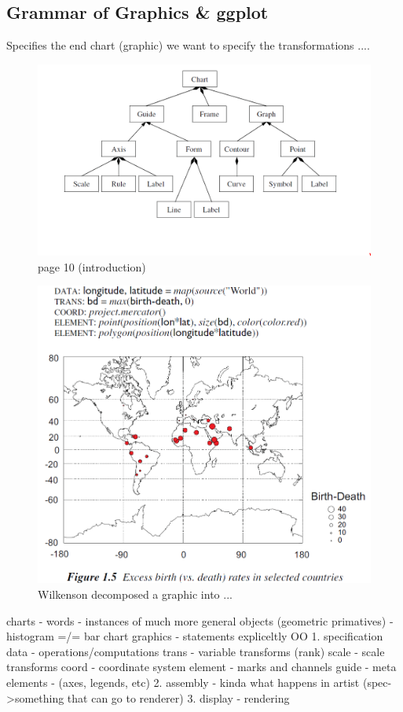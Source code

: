 \documentclass[letterpaper,onecolumn,titlepage]{Ythesis}
\begin{document}
\subsection{Grammar of Graphics \& ggplot}
Specifies the end chart (graphic)
we want to specify the transformations ....
\begin{figure}
    \includegraphics{figures/intro/grammar_chart_composition.png}
    \caption{page 10 (introduction)}
\end{figure}
\begin{figure}
    \includegraphics{figures/intro/grammar_example.png}
    \caption{Wilkenson decomposed a graphic into ...} 
\end{figure}
\cite{wilkinsonGrammarGraphicsStatistics2005}
charts - words 
    - instances of much more general objects (geometric primatives)
    - histogram =/= bar chart
graphics - statements 
expliceltly OO
    1. specification
        data - operations/computations
        trans - variable transforms (rank)
        scale - scale transforms
        coord - coordinate system
        element - marks and channels
        guide - meta elements - (axes, legends, etc)
    2. assembly - kinda what happens in artist (spec->something that can go to renderer) 
    3. display - rendering
\end{document}
